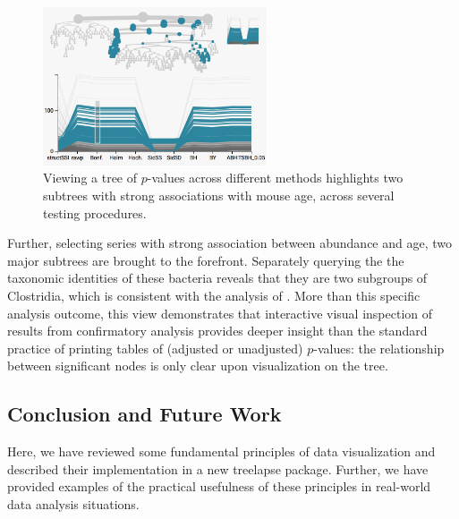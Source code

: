 \documentclass[12pt]{article}
\begin{document}
\begin{figure}

{\centering \includegraphics[width=250px]{figure/structssi}

}

\caption{Viewing a tree of $p$-values across different methods highlights two subtrees with strong associations with mouse age, across several testing procedures.}\label{fig:structssi}
\end{figure}

Further, selecting series with strong association between abundance and
age, two major subtrees are brought to the forefront. Separately
querying the the taxonomic identities of these bacteria reveals that they are
two subgroups of Clostridia, which is consistent with the analysis of
\citep{callahan2016bioconductor}. More than this specific analysis outcome, this
view demonstrates that interactive visual inspection of results from
confirmatory analysis provides deeper insight than the standard practice of
printing tables of (adjusted or unadjusted) $p$-values: the relationship between
significant nodes is only clear upon visualization on the tree.

\subsection*{Conclusion and Future Work}\label{conclusion}

Here, we have reviewed some fundamental principles of data visualization
and described their implementation in a new treelapse package. Further,
we have provided examples of the practical usefulness of these
principles in real-world data analysis situations.
\end{document}

